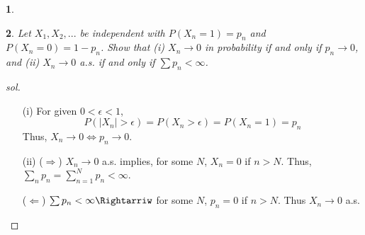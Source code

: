 \documentclass{report}
\newtheorem{ex}{}[section]
\begin{document}
\begin{ex}
\end{ex}
\begin{ex}
Let $X_1,X_2,...$ be independent with $P(X_n = 1) = p_n$ and $P(X_n = 0) = 1 - p_n$. Show that (i) $X_n \to 0$ in probability if and only if $p_n \to 0$, and (ii) $X_n \to 0$ a.s. if and only if $\sum p_n < \infty$.
\end{ex}
\begin{proof}[sol]~
\begin{enumerate}
\item[(i)]
For given $0 <\epsilon < 1$,
\[P(|X_n| > \epsilon) = P(X_n > \epsilon) = P(X_n = 1) = p_n\]
Thus, $X_n \to 0 \Leftrightarrow p_n \to 0$.
\item[(ii)]
($\Rightarrow$)
$X_n \to 0$ a.s. implies, for some $N$, $X_n = 0$ if $n > N$. Thus, $\sum_n p_n = \sum_{n=1}^N p_n <\infty$.

($\Leftarrow$)
$\sum p_n < \infty \Rightarriw$ for some $N$, $p_n = 0$ if $n > N$. Thus $X_n \to 0$ a.s.
\end{enumerate}
\end{proof}
\end{document}

